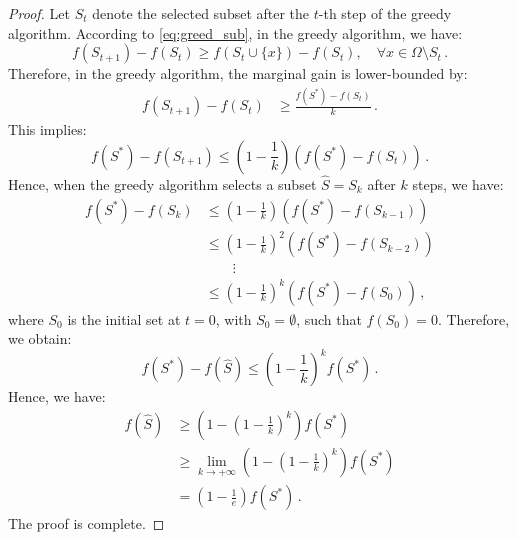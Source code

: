 \begin{proof}
    Let \( S_t \) denote the selected subset after the \(t\)-th step of the greedy algorithm. According to \cref{eq:greed_sub}, in the greedy algorithm, we have:
    \begin{equation}
        f(S_{t+1}) - f(S_t) \geq f(S_t \cup \{x\}) - f(S_t), \quad \forall x \in \Omega \setminus S_t\,.
    \end{equation}
    Therefore, in the greedy algorithm, the marginal gain is lower-bounded by:
    \begin{equation}\begin{aligned}\label{eq:margin_gain_lowerbound}
        f(S_{t+1}) - f(S_t) &\geq \frac{f(S^*) - f(S_t)}{k}\,.
    \end{aligned}\end{equation}
    This implies:
    \begin{equation}
        f(S^*) - f(S_{t+1}) \leq \left(1 - \frac{1}{k}\right)(f(S^*) - f(S_t))\,.
    \end{equation}
    Hence, when the greedy algorithm selects a subset \( \hat{S} = S_k \) after \(k\) steps, we have:
    \begin{equation}\begin{aligned}
        f(S^*) - f(S_k) &\leq \left(1 - \frac{1}{k}\right)(f(S^*) - f(S_{k-1})) \\
        &\leq \left(1 - \frac{1}{k}\right)^2(f(S^*) - f(S_{k-2})) \\
        & \qquad \vdots \\
        &\leq \left(1 - \frac{1}{k}\right)^k(f(S^*) - f(S_0))\,,
    \end{aligned}\end{equation}
    where \( S_0 \) is the initial set at \( t = 0 \), with \( S_0 = \emptyset \), such that \( f(S_0) = 0 \).
    Therefore, we obtain:
    \begin{equation}
        f(S^*) - f(\hat{S}) \leq \left(1 - \frac{1}{k}\right)^k f(S^*)\,.
    \end{equation}
    Hence, we have:
    \begin{equation}\begin{aligned}\label{eq:detailed_bound}
        f(\hat{S}) 
            &\geq \left( 1 - \left(1 - \frac{1}{k}\right)^k \right) f(S^*) \\
            &\geq \lim_{k \to +\infty} \left( 1 - \left(1 - \frac{1}{k}\right)^k \right) f(S^*) \\
            & = \left(1 - \frac{1}{e}\right) f(S^*)\,.
    \end{aligned}\end{equation}
    The proof is complete.
\end{proof}


